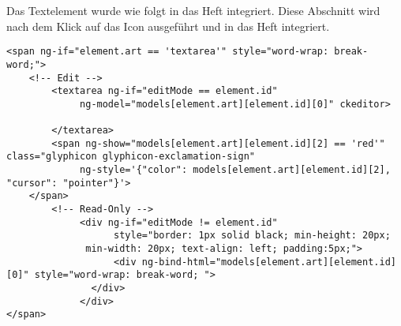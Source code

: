 Das Textelement wurde wie folgt in das Heft integriert. Diese Abschnitt wird nach dem Klick auf das Icon ausgeführt und in das Heft integriert.
\begin{lstlisting}[caption={Einbindung des Textelements}]
<span ng-if="element.art == 'textarea'" style="word-wrap: break-word;">
	<!-- Edit -->
        <textarea ng-if="editMode == element.id"
             ng-model="models[element.art][element.id][0]" ckeditor>

        </textarea>
        <span ng-show="models[element.art][element.id][2] == 'red'" class="glyphicon glyphicon-exclamation-sign"
             ng-style='{"color": models[element.art][element.id][2], "cursor": "pointer"}'>
	</span>
        <!-- Read-Only -->
             <div ng-if="editMode != element.id"
                   style="border: 1px solid black; min-height: 20px; 
			  min-width: 20px; text-align: left; padding:5px;">
                   <div ng-bind-html="models[element.art][element.id][0]" style="word-wrap: break-word; ">
	           </div>
             </div>
</span>
\end{lstlisting}


